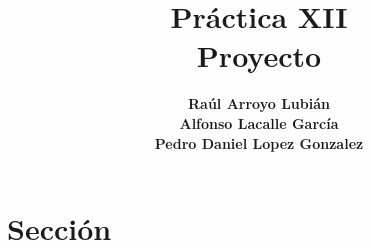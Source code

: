 \documentclass[a4paper,11pt]{article}
\title
{
    \textbf{Práctica XII}\\
    \textbf{Proyecto}
}
\author
{
 	\textbf{Raúl Arroyo Lubián}\\
    \textbf{Alfonso Lacalle García}\\
    \textbf{Pedro Daniel Lopez Gonzalez}
}
\begin{document}
	\maketitle
	\newpage
	\tableofcontents
	\newpage
	\section{Sección}
    
\end{document}
